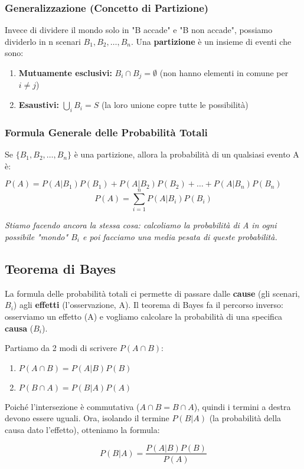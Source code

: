 \documentclass[a4paper, 11pt]{article}
\theoremstyle{definition}
\begin{document}
\subsubsection*{Generalizzazione (Concetto di Partizione)}
Invece di dividere il mondo solo in "B accade" e "B non accade", possiamo dividerlo in n scenari $B_1, B_2, \dots, B_n$. Una \textbf{partizione} è un insieme di eventi che sono:
\begin{enumerate}
    \item \textbf{Mutuamente esclusivi:} $B_i \cap B_j = \emptyset$ (non hanno elementi in comune per $i \neq j$)
    \item \textbf{Esaustivi:} $\bigcup_i B_i = S$ (la loro unione copre tutte le possibilità)
\end{enumerate}

\subsubsection*{Formula Generale delle Probabilità Totali}
Se $\{B_1, B_2, \dots, B_n\}$ è una partizione, allora la probabilità di un qualsiasi evento A è:
\begin{formulabox}
    $P(A) = P(A|B_1)P(B_1) + P(A|B_2)P(B_2) + \dots + P(A|B_n)P(B_n)$
    \[ P(A) = \sum_{i=1}^{n} P(A|B_i)P(B_i) \]
\end{formulabox}
\textit{Stiamo facendo ancora la stessa cosa: calcoliamo la probabilità di A in ogni possibile "mondo" $B_i$ e poi facciamo una media pesata di queste probabilità.}

\subsection{Teorema di Bayes}
La formula delle probabilità totali ci permette di passare dalle \textbf{cause} (gli scenari, $B_i$) agli \textbf{effetti} (l'osservazione, A). Il teorema di Bayes fa il percorso inverso: osserviamo un effetto (A) e vogliamo calcolare la probabilità di una specifica \textbf{causa} ($B_i$).

Partiamo da 2 modi di scrivere $P(A \cap B)$:
\begin{enumerate}
    \item $P(A \cap B) = P(A|B)P(B)$ \quad [definizione di $P(A|B)$]
    \item $P(B \cap A) = P(B|A)P(A)$ \quad [definizione di $P(B|A)$]
\end{enumerate}
Poiché l'intersezione è commutativa ($A \cap B = B \cap A$), quindi i termini a destra devono essere uguali. Ora, isolando il termine $P(B|A)$ (la probabilità della causa dato l'effetto), otteniamo la formula:
\begin{formulabox}[title={Teorema di Bayes (forma semplice)}]
    \[ P(B|A) = \frac{P(A|B)P(B)}{P(A)} \]
\end{formulabox}
\end{document}
